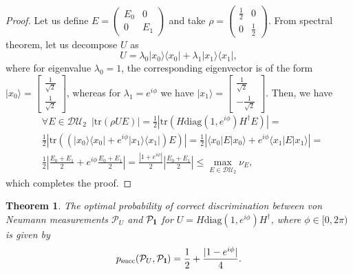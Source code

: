 \documentclass[preprint,12pt, a4paper, dvipsnames]{elsarticle}
\newcommand{\ket}[1]{\ensuremath{|#1\rangle}}
\newcommand{\bra}[1]{\ensuremath{\langle#1|}}
\newcommand{\ketbra}[2]{\ensuremath{\ket{#1}\bra{#2}}}
\newcommand{\proj}[1]{\ensuremath{\ketbra{#1}{#1}}}
\newcommand{\1}{{\rm 1\hspace{-0.9mm}l}}
\newcommand{\Id}{{\rm 1\hspace{-0.9mm}l}}
\newcommand{\PP}{\mathcal{P}}
\newcommand{\diaguni}{\ensuremath{\mathcal{DU}}}
\newcommand{\diag}{\mathrm{diag}}
\newcommand{\tr}{\mathrm{tr}}
\newtheorem{theorem}{Theorem}
\begin{document}
\begin{proof}
	Let us define $E = \left(\begin{array}{cc}E_0&0\\0&E_1\end{array}\right)  $
	and take $\rho =
	\left(\begin{array}{cc}\frac{1}{2}&0\\0&\frac{1}{2}\end{array}\right) $.
	From spectral theorem, let us decompose $U$ as
	\begin{equation}
	U= \lambda_0 \ketbra{x_0}{x_0} + \lambda_1 \ketbra{x_1}{x_1},
	\end{equation}
	where  for eigenvalue $\lambda_0 = 1$, the corresponding
	eigenvector is
	of the form $\ket{x_0} = \left[\begin{array}{c}\frac{1}{\sqrt{2}}\\\frac{1}{\sqrt{2}}\end{array}\right]
	$,
	whereas for  $\lambda_1= e^{i \phi}$ we have $\ket{x_1} = \left[\begin{array}{c}\frac{1}{\sqrt{2}}\\-\frac{1}{\sqrt{2}}\end{array}\right]
	$.
	Then, we have
	\begin{equation}
	\begin{split}
	& \forall E \in \diaguni_2 \,\,\, | \tr (\rho U E) | = \frac{1}{2}  \left| \tr \left(
	H \diag(1, e^{i\phi}) H^\dagger E \right) \right| =  \\ &
	\frac{1}{2} \left| \tr\left((   \proj{x_0} +e^{i \phi}\proj{x_1} ) E \right)
	\right|  =
	\frac{1}{2} \left|  \bra{x_0} E \ket{x_0} +  e^{i \phi}\bra{x_1} E \ket{x_1}
	\right| = \\&
	\frac{1}{2} \left| \frac{E_0 + E_1}{2} + e^{i \phi } \frac{E_0+E_1}{2} \right|
	=
	\frac{\left| 1+ e^{i \phi } \right|}{2} \left| \frac{E_0 + E_1}{2} \right| \le
	\max_{E \in \diaguni_2 } \nu_{E},
	\end{split}
	\end{equation}
	which completes the proof.
\end{proof}



\begin{theorem}\label{th:probability}
	The optimal probability of correct discrimination between von Neumann
	measurements $\PP_U$ and $\PP_{\Id}$ for $U = H \diag(1, e^{i \phi}) H^\dagger$,
	where $\phi \in [0, 2\pi)$ is given by
	\begin{equation}
	p_{\text{succ}}(\PP_{U}, \PP_{\Id}) = \frac{1}{2} + \frac{|1 - e^{i \phi}  |}{4} .
	\end{equation}
\end{theorem}
\end{document}
